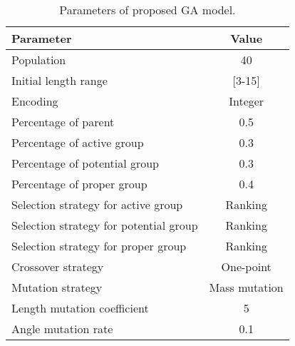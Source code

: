\renewcommand{\arraystretch}{0.7}
\begin{table}
\centering
\caption{Parameters of proposed GA model.}
\label{tab:ga}
\begin{adjustbox}{width=0.75\textwidth}
\begin{tabular}{lc}
\toprule
Parameter								&  Value  \\
\midrule
Population                              & 40        \\
Initial length range					& [3-15]    \\
Encoding								& Integer   \\
Percentage of parent                    & 0.5   \\
Percentage of active group				& 0.3   \\
Percentage of potential group			& 0.3   \\
Percentage of proper group				& 0.4   \\
Selection strategy for  active group	& Ranking   \\
Selection strategy for potential group	& Ranking   \\
Selection strategy for proper group	    & Ranking   \\
Crossover strategy			    		& One-point \\
Mutation strategy			    		& Mass mutation \\
Length mutation coefficient             & 5 \\
Angle mutation rate                     & 0.1 \\
\bottomrule
\end{tabular}
\end{adjustbox}
\end{table}
\renewcommand{\arraystretch}{2}

